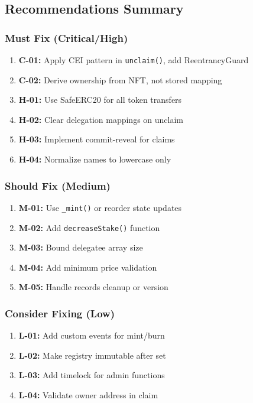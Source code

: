 \documentclass[
]{article}
\providecommand{\tightlist}{%
  \setlength{\itemsep}{0pt}\setlength{\parskip}{0pt}}
\begin{document}
\subsection{Recommendations Summary}\label{recommendations-summary}

\subsubsection{Must Fix (Critical/High)}\label{must-fix-criticalhigh}

\begin{enumerate}
\def\labelenumi{\arabic{enumi}.}
\tightlist
\item
  \textbf{C-01:} Apply CEI pattern in \texttt{unclaim()}, add
  ReentrancyGuard
\item
  \textbf{C-02:} Derive ownership from NFT, not stored mapping
\item
  \textbf{H-01:} Use SafeERC20 for all token transfers
\item
  \textbf{H-02:} Clear delegation mappings on unclaim
\item
  \textbf{H-03:} Implement commit-reveal for claims
\item
  \textbf{H-04:} Normalize names to lowercase only
\end{enumerate}

\subsubsection{Should Fix (Medium)}\label{should-fix-medium}

\begin{enumerate}
\def\labelenumi{\arabic{enumi}.}
\tightlist
\item
  \textbf{M-01:} Use \texttt{\_mint()} or reorder state updates
\item
  \textbf{M-02:} Add \texttt{decreaseStake()} function
\item
  \textbf{M-03:} Bound delegatee array size
\item
  \textbf{M-04:} Add minimum price validation
\item
  \textbf{M-05:} Handle records cleanup or version
\end{enumerate}

\subsubsection{Consider Fixing (Low)}\label{consider-fixing-low}

\begin{enumerate}
\def\labelenumi{\arabic{enumi}.}
\tightlist
\item
  \textbf{L-01:} Add custom events for mint/burn
\item
  \textbf{L-02:} Make registry immutable after set
\item
  \textbf{L-03:} Add timelock for admin functions
\item
  \textbf{L-04:} Validate owner address in claim
\end{enumerate}
\end{document}
